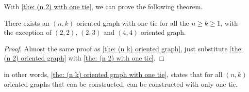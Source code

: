With \cref{the: (n 2) with one tie},
we can prove the following theorem.

\begin{theorem}\label{the: (n k) oriented graph with one tie}
  There exists an \((n, k)\) oriented graph
  with one tie for all the \(n \geq k \geq 1\),
  with the exception of
  \((2, 2)\), \((2, 3)\) and \((4, 4)\) oriented graph.
\end{theorem}

\begin{proof}
  Almost the same proof as \cref{the: (n k) oriented graph},
  just substitute \cref{the: (n 2) oriented graph} with
   \cref{the: (n 2) with one tie}.
\end{proof}

in other words,
\cref{the: (n k) oriented graph with one tie},
states that for all \((n, k)\) oriented graphs
that can be constructed, can be constructed with only one tie.

